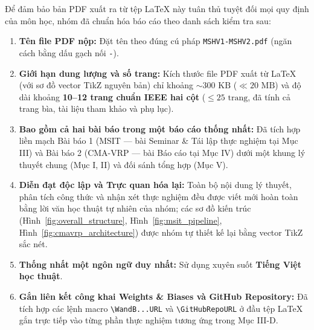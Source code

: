 \documentclass[conference,10pt]{IEEEtran}
\begin{document}
Để đảm bảo bản PDF xuất ra từ tệp LaTeX này tuân thủ tuyệt đối mọi quy định của môn học, nhóm đã chuẩn hóa báo cáo theo danh sách kiểm tra sau:
\begin{enumerate}
    \item \textbf{Tên file PDF nộp:} Đặt tên theo đúng cú pháp \texttt{MSHV1-MSHV2.pdf} (ngăn cách bằng dấu gạch nối \texttt{-}).
    \item \textbf{Giới hạn dung lượng và số trang:} Kích thước file PDF xuất từ LaTeX (với sơ đồ vector TikZ nguyên bản) chỉ khoảng $\sim 300\text{ KB}$ ($\ll 20\text{ MB}$) và độ dài khoảng \textbf{10--12 trang chuẩn IEEE hai cột} ($\le 25\text{ trang}$, đã tính cả trang bìa, tài liệu tham khảo và phụ lục).
    \item \textbf{Bao gồm cả hai bài báo trong một báo cáo thống nhất:} Đã tích hợp liền mạch Bài báo 1 (MSIT --- bài Seminar \& Tái lập thực nghiệm tại Mục III) và Bài báo 2 (CMA-VRP --- bài Báo cáo tại Mục IV) dưới một khung lý thuyết chung (Mục I, II) và đối sánh tổng hợp (Mục V).
    \item \textbf{Diễn đạt độc lập và Trực quan hóa lại:} Toàn bộ nội dung lý thuyết, phân tích công thức và nhận xét thực nghiệm đều được viết mới hoàn toàn bằng lời văn học thuật tự nhiên của nhóm; các sơ đồ kiến trúc (Hình~\ref{fig:overall_structure}, Hình~\ref{fig:msit_pipeline}, Hình~\ref{fig:cmavrp_architecture}) được nhóm tự thiết kế lại bằng vector TikZ sắc nét.
    \item \textbf{Thống nhất một ngôn ngữ duy nhất:} Sử dụng xuyên suốt \textbf{Tiếng Việt học thuật}.
    \item \textbf{Gắn liên kết công khai Weights \& Biases và GitHub Repository:} Đã tích hợp các lệnh macro \texttt{\textbackslash WandB...URL} và \texttt{\textbackslash GitHubRepoURL} ở đầu tệp LaTeX gắn trực tiếp vào từng phần thực nghiệm tương ứng trong Mục III-D.
\end{enumerate}
\end{document}
